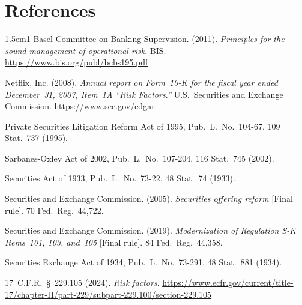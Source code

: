 \documentclass[11pt,openany]{book}
\begin{document}
\section*{References}

\begin{hangparas}{1.5em}{1}
Basel Committee on Banking Supervision. (2011). \textit{Principles for the sound management of operational risk}. BIS. \url{https://www.bis.org/publ/bcbs195.pdf}

Netflix, Inc. (2008). \textit{Annual report on Form~10-K for the fiscal year ended December~31, 2007, Item~1A ``Risk Factors.''} U.S.\ Securities and Exchange Commission. \url{https://www.sec.gov/edgar}

Private Securities Litigation Reform Act of 1995, Pub.\ L.\ No.\ 104-67, 109 Stat.\ 737 (1995).

Sarbanes-Oxley Act of 2002, Pub.\ L.\ No.\ 107-204, 116 Stat.\ 745 (2002).

Securities Act of 1933, Pub.\ L.\ No.\ 73-22, 48 Stat.\ 74 (1933).

Securities and Exchange Commission. (2005). \textit{Securities offering reform} [Final rule]. 70 Fed.\ Reg.\ 44,722.

Securities and Exchange Commission. (2019). \textit{Modernization of Regulation S-K Items~101, 103, and~105} [Final rule]. 84 Fed.\ Reg.\ 44,358.

Securities Exchange Act of 1934, Pub.\ L.\ No.\ 73-291, 48 Stat.\ 881 (1934).

17~C.F.R.\ \S~229.105 (2024). \textit{Risk factors}. \url{https://www.ecfr.gov/current/title-17/chapter-II/part-229/subpart-229.100/section-229.105}
\end{hangparas}
\end{document}
